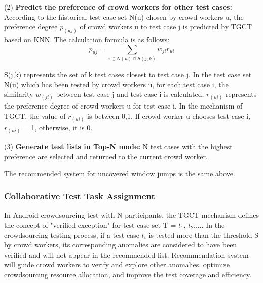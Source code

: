 (2) \textbf{Predict the preference of crowd workers for other test cases:} According to the historical test case set N(u) chosen by crowd workers u, the preference degree $p_(uj)$ of crowd workers u to test case j is predicted by TGCT based on KNN. The calculation formula is as follows:
\begin{equation}
p_{uj} = \sum_{i\in N(u) \cap S(j,k)}w_{ji}r_{ui}
\end{equation}

S(j,k) represents the set of k test cases closest to test case j. In the test case set N(u) which has been tested by crowd workers u, for each test case i, the similarity $w_(ji)$ between test case j and test case i is calculated. $r_(ui)$ represents the preference degree of crowd workers u for test case i. In the mechanism of TGCT, the value of $r_(ui)$ is between {0,1}. If crowd worker u chooses test case i, $r_(ui)$ = 1, otherwise, it is 0. 

(3) \textbf{Generate test lists in Top-N mode:} N test cases with the highest preference are selected and returned to the current crowd worker.

The recommended system for uncovered window jumps is the same above.

\subsubsection{Collaborative Test Task Assignment}
In Android crowdsourcing test with N participants, the TGCT mechanism defines the concept of "verified exception" for test case set T = {$t_{1}$, $t_{2}$,...}. In the crowdsourcing testing process, if a test case $t_{i}$ is tested more than the threshold S by crowd workers, its corresponding anomalies are considered to have been verified and will not appear in the recommended list. Recommendation system will guide crowd workers to verify and explore other anomalies, optimize crowdsourcing resource allocation, and improve the test coverage and efficiency.

